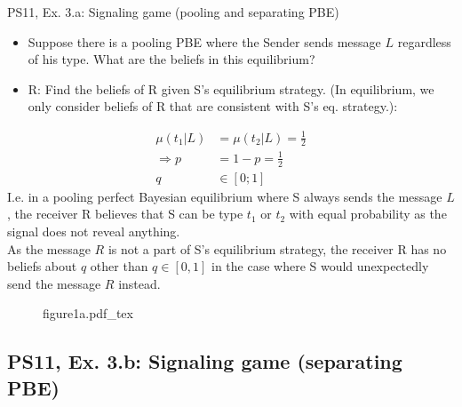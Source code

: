 \begin{frame}{PS11, Ex. 3.a: Signaling game (pooling and separating PBE)}
    \begin{itemize}
      \item[(a)] Suppose there is a pooling PBE where the Sender sends message $L$ regardless of his type. What are the beliefs in this equilibrium?
    \end{itemize} \vspace{-8pt}
    \begin{multicols}{2}
      \begin{itemize}
        \item[SR3:] R: Find the beliefs of R given S's equilibrium strategy. (In equilibrium, we only consider beliefs of R that are consistent with S's eq. strategy.):
      \end{itemize}\vspace{-4pt}
      \begin{align*}
        \mu(t_1|L)&=\mu(t_2|L)=\frac{1}{2}\\
        \Rightarrow p&=1-p=\frac{1}{2}\\
        q&\in[0;1]
      \end{align*}
      I.e. in a pooling perfect Bayesian equilibrium where S always sends the message $L$, the receiver R believes that S can be type $t_1$ or $t_2$ with equal probability as the signal does not reveal anything.\\\medskip
      As the message $R$ is not a part of S's equilibrium strategy, the receiver R has no beliefs about $q$ other than $q\in[0,1]$ in the case where S would unexpectedly send the message $R$ instead.
      \vfill\null\columnbreak
      \begin{figure}[!h]
        \center\def\svgwidth{\columnwidth}
        {figure1a.pdf_tex}
      \end{figure}
      \vfill\null \columnbreak
      \vfill
    \end{multicols}
\end{frame}


\subsection{PS11, Ex. 3.b: Signaling game (separating PBE)}

